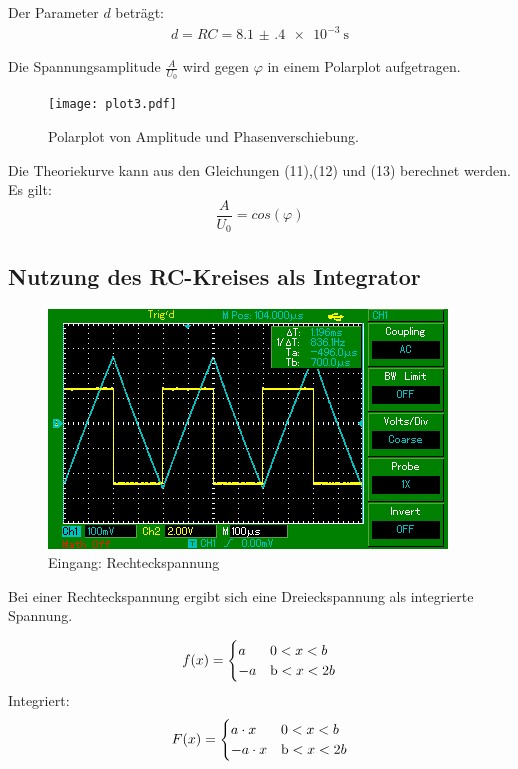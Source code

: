 Der Parameter $d$ beträgt:
\begin{align*}
  d = RC = \SI{8.1(4)e-3}{\second}
\end{align*}

Die Spannungsamplitude $\frac{A}{U_0}$ wird gegen $\varphi$ in einem Polarplot aufgetragen.

\begin{figure}[H]
  \centering
  \texttt{[image: plot3.pdf]}
  \caption{Polarplot von Amplitude und Phasenverschiebung.}
  \label{fig:Polarplot}
\end{figure}

Die Theoriekurve kann aus den Gleichungen (11),(12) und (13) berechnet werden.
Es gilt:
\begin{equation}
  \frac{A}{U_0} = cos(\varphi)
\end{equation}

\subsection{Nutzung des RC-Kreises als Integrator}

\begin{figure}[H]
  \centering
  \includegraphics{MAP001.png}
  \caption{Eingang: Rechteckspannung}
  \label{fig:Rechteckspannung}
\end{figure}

Bei einer Rechteckspannung ergibt sich eine Dreieckspannung als integrierte Spannung.

\begin{equation*}
  f(x) =
  \begin{cases}
    a & \text 0 < x < b \\
    -a & \text b < x < 2b \\
  \end{cases}
\end{equation*}
Integriert:
\begin{equation*}
  F(x) =
  \begin{cases}
    a \cdot x & \text 0 < x < b \\
    -a \cdot x & \text b < x < 2b \\
  \end{cases}
\end{equation*}

